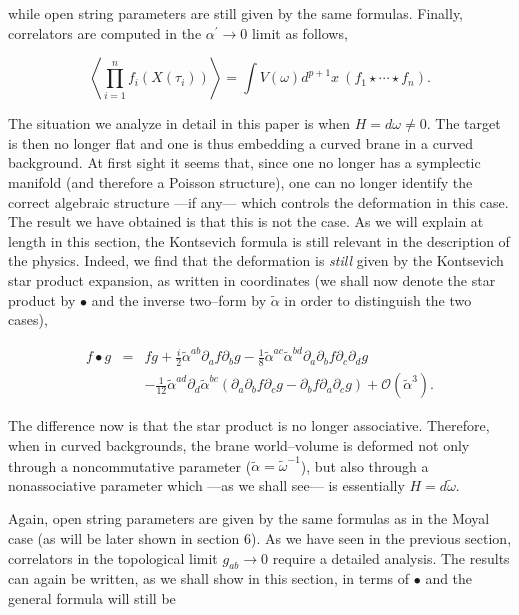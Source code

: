 \documentclass[a4paper,11pt]{article}
\newcommand{\notag}{\nonumber}
\begin{document}
\noindent 
while open string parameters are still given by the same formulas.
Finally, correlators are computed in the $\alpha^{\prime} \rightarrow 0$
limit as follows,

$$
\left\langle \prod_{i=1}^{n} f_{i} \left( X(\tau_{i}) \right) \right\rangle
= \int V(\omega) d^{p+1}x\ \left( f_{1} \star \cdots \star f_{n} \right).
$$

The situation we analyze in detail in this paper is when $H = d\omega \neq
0$.  The target is then no longer flat and one is thus embedding a curved
brane in a curved background. At first sight it seems that, since one no
longer has a symplectic manifold (and therefore a Poisson structure), one
can no longer identify the correct algebraic structure ---if any--- which
controls the deformation in this case. The result we have obtained is that
this is not the case. As we will explain at length in this section, the
Kontsevich formula is still relevant in the description of the
physics. Indeed, we find that the deformation is \textit{still} given by
the Kontsevich star product expansion, as written in coordinates (we shall
now denote the star product by $\bullet$ and the inverse two--form by
$\widetilde{\alpha}$ in order to distinguish the two cases),

\begin{eqnarray}
f\bullet g &=&fg+{\frac{i}{2}}\widetilde{\alpha }^{ab}\partial _{a}f\partial
_{b}g-{\frac{1}{8}}\widetilde{\alpha }^{ac}\widetilde{\alpha }^{bd}\partial
_{a}\partial _{b}f\partial _{c}\partial _{d}g  \notag
\label{kontsevich-nonassociative} \\
&&-{\frac{1}{12}}\widetilde{\alpha }^{ad}\partial _{d}\widetilde{\alpha}^{bc}
\left( \partial _{a}\partial _{b}f\partial _{c}g-\partial _{b}f\partial
_{a}\partial _{c}g\right) +\mathcal{O}(\widetilde{\alpha }^{3}).
\end{eqnarray}

\noindent 
The difference now is that the star product is no longer
associative. Therefore, when in curved backgrounds, the brane world--volume
is deformed not only through a noncommutative parameter
($\widetilde{\alpha} = \widetilde{\omega }^{-1}$), but also through a
nonassociative parameter which ---as we shall see--- is essentially
$H=d\widetilde{\omega }$.

Again, open string parameters are given by the same formulas as in the
Moyal case (as will be later shown in section 6). As we have seen in the
previous section, correlators in the topological limit $g_{ab} \rightarrow
0$ require a detailed analysis. The results can again be written, as we
shall show in this section, in terms of $\bullet$ and the general formula
will still be
\end{document}
